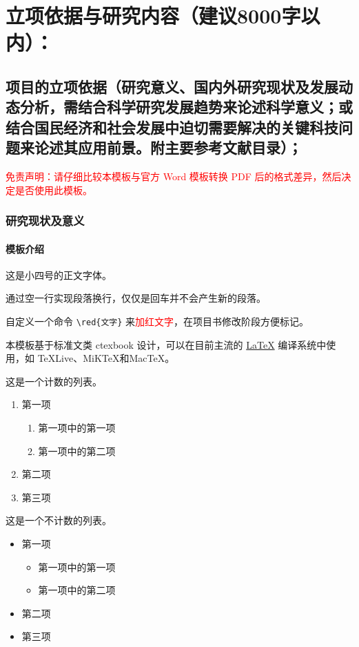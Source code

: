 \documentclass[YF]{nsfc}
\newcommand{\red}[1]{\textcolor{red}{#1}}
\begin{document}
\maketitlepage

\chapter{\textbf{立项依据与研究内容}（建议8000字以内）：}
\section{\textbf{项目的立项依据}（研究意义、国内外研究现状及发展动态分析，需结合科学研究发展趋势来论述科学意义；或结合国民经济和社会发展中迫切需要解决的关键科技问题来论述其应用前景。附主要参考文献目录）；}

\red{免责声明：请仔细比较本模板与官方 Word 模板转换 PDF 后的格式差异，然后决定是否使用此模板。}

\subsection{研究现状及意义}

\subsubsection{模板介绍}

这是小四号的正文字体。

通过空一行实现段落换行，仅仅是回车并不会产生新的段落。

自定义一个命令 \verb|\red{文字}| 来\red{加红文字}，在项目书修改阶段方便标记。

本模板基于标准文类 ctexbook 设计，可以在目前主流的 \href{https://en.wikibooks.org/wiki/LaTeX/Introduction}{\LaTeX{}} 编译系统中使用，如 \TeX{}Live、MiK\TeX{}和Mac\TeX{}。

这是一个计数的列表。
\begin{enumerate}
  \item 第一项
    \begin{enumerate}
      \item 第一项中的第一项
      \item 第一项中的第二项
    \end{enumerate}
  \item 第二项
  \item 第三项
\end{enumerate}

这是一个不计数的列表。
\begin{itemize}
  \item 第一项
  \begin{itemize}
    \item 第一项中的第一项
    \item 第一项中的第二项
  \end{itemize}
  \item 第二项
  \item 第三项
\end{itemize}
\end{document}
